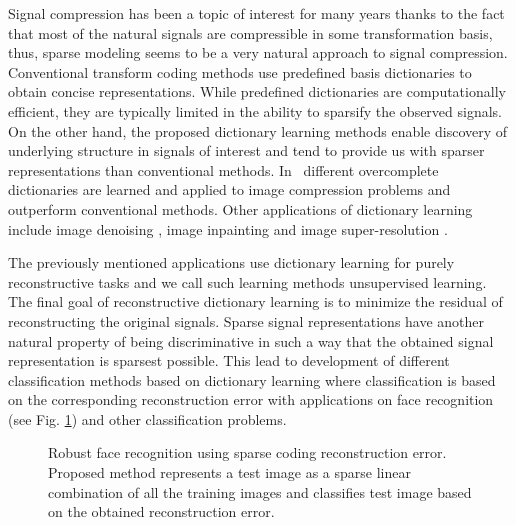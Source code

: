 \documentclass[journal]{IEEEtran}
\begin{document}
Signal compression has been a topic of interest for many years thanks to the fact that most of the natural signals are compressible in some transformation basis, thus, sparse modeling seems to be a very natural approach to signal compression. Conventional transform coding methods use predefined basis dictionaries to obtain concise representations. While predefined dictionaries are computationally efficient, they are typically limited in the ability to sparsify the observed signals. On the other hand, the proposed dictionary learning methods enable discovery of underlying structure in signals of interest and tend to provide us with sparser representations than conventional methods. In~\cite{nejati2016boosted, horev2012adaptive, skretting2011image} different overcomplete dictionaries are learned and applied to image compression problems and outperform conventional methods. Other applications of dictionary learning include image denoising \cite{Elad2008}, image inpainting \cite{Shen2009, Mairal2008} and image super-resolution \cite{yang2010image, kim2010single, yang2008image}.

The previously mentioned applications use dictionary learning for purely reconstructive tasks and we call such learning methods unsupervised learning. The final goal of reconstructive dictionary learning is to minimize the residual of reconstructing the original signals. Sparse signal representations have another natural property of being discriminative in such a way that the obtained signal representation is sparsest possible. This lead to development of different classification methods based on dictionary learning where classification is based on the corresponding reconstruction error \cite{Zhang2010, ZhuolinJiang2013} with applications on face recognition \cite{Wright2009_src} (see Fig. \ref{fig:face_recognition}) and other classification problems.
%
\begin{figure}[h]
	\centering
		
	\caption{Robust face recognition using sparse coding reconstruction error. Proposed method represents a test image as a sparse linear combination of all the training images and classifies test image based on the obtained reconstruction error. \cite{Wright2009_src}}
	
	\label{fig:face_recognition}
\end{figure}
\end{document}
